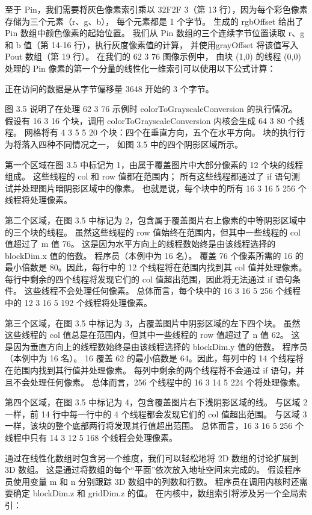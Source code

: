 至于 Pin，我们需要将灰色像素索引乘以 32F2F 3（第 13 行），因为每个彩色像素存储为三个元素（r、g、b），
每个元素都是 1 个字节。 生成的 rgbOffset 给出了 Pin 数组中颜色像素的起始位置。 
我们从 Pin 数组的三个连续字节位置读取 r、g 和 b 值（第 14-16 行），执行灰度像素值的计算，
并使用grayOffset 将该值写入 Pout 数组（第 19 行）。 在我们的 62 3 76 图像示例中，
由块 (1,0) 的线程 (0,0) 处理的 Pin 像素的第一个分量的线性化一维索引可以使用以下公式计算：

正在访问的数据是从字节偏移量 3648 开始的 3 个字节。

图 3.5 说明了在处理 62 3 76 示例时 colorToGrayscaleConversion 的执行情况。 
假设有 16 3 16 个块，调用 colorToGrayscaleConversion 内核会生成 64 3 80 个线程。 
网格将有 4 3 5 5 20 个块：四个在垂直方向，五个在水平方向。 块的执行行为将落入四种不同情况之一，
如图 3.5 中的四个阴影区域所示。

第一个区域在图 3.5 中标记为 1，由属于覆盖图片中大部分像素的 12 个块的线程组成。 这些线程的 col 和 row 值都在范围内； 
所有这些线程都通过了 if 语句测试并处理图片暗阴影区域中的像素。 也就是说，每个块中的所有 16 3 16 5 256 个线程将处理像素。

第二个区域，在图 3.5 中标记为 2，包含属于覆盖图片右上像素的中等阴影区域中的三个块的线程。 
虽然这些线程的 row 值始终在范围内，但其中一些线程的 col 值超过了 m 值 76。
这是因为水平方向上的线程数始终是由该线程选择的 blockDim.x 值的倍数。 程序员（本例中为 16 名）。 
覆盖 76 个像素所需的 16 的最小倍数是 80。因此，每行中的 12 个线程将在范围内找到其 col 值并处理像素。 
每行中剩余的四个线程将发现它们的 col 值超出范围，因此将无法通过 if 语句条件。 这些线程不会处理任何像素。 
总体而言，每个块中的 16 3 16 5 256 个线程中的 12 3 16 5 192 个线程将处理像素。

第三个区域，在图 3.5 中标记为 3，占覆盖图片中阴影区域的左下四个块。 
虽然这些线程的 col 值总是在范围内，但其中一些线程的 row 值超过了 n 值 62。
这是因为垂直方向上的线程数始终是由该线程选择的 blockDim.y 值的倍数。 程序员（本例中为 16 名）。 
16 覆盖 62 的最小倍数是 64。因此，每列中的 14 个线程将在范围内找到其行值并处理像素。 
每列中剩余的两个线程将不会通过 if 语句，并且不会处理任何像素。 总体而言，256 个线程中的 16 3 14 5 224 个将处理像素。

第四个区域，在图 3.5 中标记为 4，包含覆盖图片右下浅阴影区域的线。 
与区域 2 一样，前 14 行中每一行中的 4 个线程都会发现它们的 col 值超出范围。 
与区域 3 一样，该块的整个底部两行将发现其行值超出范围。 
总体而言，16 3 16 5 256 个线程中只有 14 3 12 5 168 个线程会处理像素。

通过在线性化数组时包含另一个维度，我们可以轻松地将 2D 数组的讨论扩展到 3D 数组。 
这是通过将数组的每个“平面”依次放入地址空间来完成的。 假设程序员使用变量 m 和 n 分别跟踪 3D 数组中的列数和行数。 
程序员在调用内核时还需要确定 blockDim.z 和 gridDim.z 的值。 在内核中，数组索引将涉及另一个全局索引：

